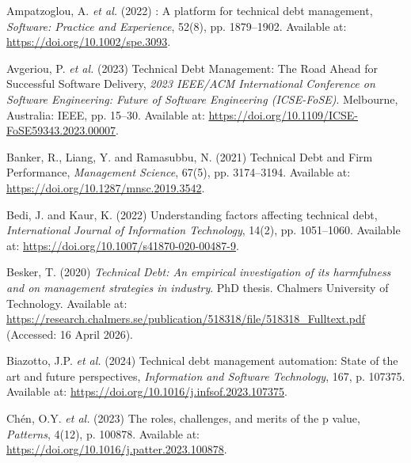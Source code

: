 \documentclass[
  12pt,
  letterpaper,
  12pt,
  oneside,
  english,
  onehalfspacing,
  headsepline]{MastersDoctoralThesis}
\newlength{\cslhangindent}
\newenvironment{CSLReferences}[2] %
 {\begin{list}{}{%
  \setlength{\itemindent}{0pt}
  \setlength{\leftmargin}{0pt}
  \setlength{\parsep}{0pt}
  \ifodd #1
   \setlength{\leftmargin}{\cslhangindent}
   \setlength{\itemindent}{-1\cslhangindent}
  \fi
  \setlength{\itemsep}{#2\baselineskip}}}
 {\end{list}}
\begin{document}
\begin{CSLReferences}{0}{1}
Ampatzoglou, A. \emph{et al.} (2022) : {A}
platform for technical debt management\textquotesingle, \emph{Software:
Practice and Experience}, 52(8), pp. 1879--1902. Available at:
\url{https://doi.org/10.1002/spe.3093}.

Avgeriou, P. \emph{et al.} (2023) \textquotesingle Technical {Debt
Management}: {The Road Ahead} for {Successful Software
Delivery}\textquotesingle, \emph{2023 {IEEE}/{ACM International
Conference} on {Software Engineering}: {Future} of {Software
Engineering} ({ICSE-FoSE})}. Melbourne, Australia: IEEE, pp. 15--30.
Available at: \url{https://doi.org/10.1109/ICSE-FoSE59343.2023.00007}.

Banker, R., Liang, Y. and Ramasubbu, N. (2021)
\textquotesingle Technical {Debt} and {Firm
Performance}\textquotesingle, \emph{Management Science}, 67(5), pp.
3174--3194. Available at: \url{https://doi.org/10.1287/mnsc.2019.3542}.

Bedi, J. and Kaur, K. (2022) \textquotesingle Understanding factors
affecting technical debt\textquotesingle, \emph{International Journal of
Information Technology}, 14(2), pp. 1051--1060. Available at:
\url{https://doi.org/10.1007/s41870-020-00487-9}.

Besker, T. (2020) \emph{Technical {Debt}: {An} empirical investigation
of its harmfulness and on management strategies in industry}. PhD
thesis. Chalmers University of Technology. Available at:
\url{https://research.chalmers.se/publication/518318/file/518318_Fulltext.pdf}
(Accessed: 16 April 2026).

Biazotto, J.P. \emph{et al.} (2024) \textquotesingle Technical debt
management automation: {State} of the art and future
perspectives\textquotesingle, \emph{Information and Software
Technology}, 167, p. 107375. Available at:
\url{https://doi.org/10.1016/j.infsof.2023.107375}.

Chén, O.Y. \emph{et al.} (2023) \textquotesingle The roles, challenges,
and merits of the p value\textquotesingle, \emph{Patterns}, 4(12), p.
100878. Available at:
\url{https://doi.org/10.1016/j.patter.2023.100878}.


\end{CSLReferences}
\end{document}
